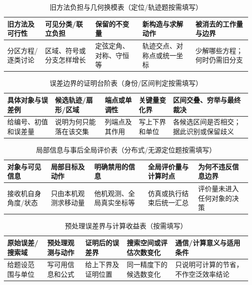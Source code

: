 \documentclass[withoutpreface,bwprint]{cumcmthesis}
\begin{document}
  \begin{table}[H]
    \centering
    \small
    \caption{旧方法负担与几何换模表（定位/轨迹题按需填写）}
    \label{tab:method-burden-switch-guide}
    \begin{tabular}{p{2.1cm}p{2.8cm}p{2.45cm}p{2.75cm}p{2.55cm}}
      \toprule
      旧方法及可行性 & 可见分类/联立负担 & 保留的不变量 & 新构造与求解动作 & 被消去的工作量与边界 \\
      \midrule
      分区方程/逐类讨论 & 区域、符号或分支怎样增长 & 定弦定角、对称、守恒等 & 轨迹交点、对称点或统一坐标 & 少解哪些方程；何时仍需旧分支 \\
      \bottomrule
    \end{tabular}
  \end{table}
  \begin{table}[H]
    \centering
    \small
    \caption{误差边界的证明台阶表（身份/区间判定按需填写）}
    \label{tab:error-bound-proof-guide}
    \begin{tabular}{p{2.15cm}p{2.85cm}p{2.15cm}p{2.25cm}p{3.25cm}}
      \toprule
      具体对象与误差例 & 候选轨迹/扇形/区域 & 端点或单调性 & 关键量变化界 & 区间交叠、穷举与最终裁决 \\
      \midrule
      给编号、初值和误差量 & 说明为何只能落在该交集 & 列端点及其作用 & 写上下界和单位 & 各候选区间是否相交；据此识别或保留歧义 \\
      \bottomrule
    \end{tabular}
  \end{table}
  \begin{table}[H]
    \centering
    \small
    \caption{局部信息与事后全局评价表（分布式/无源定位题按需填写）}
    \label{tab:local-global-information-guide}
    \begin{tabular}{p{2.2cm}p{2.45cm}p{2.25cm}p{2.7cm}p{3.0cm}}
      \toprule
      对象与可见信息 & 局部目标及动作 & 明确禁用的信息 & 全局评价量与计算时点 & 为何不违反信息边界 \\
      \midrule
      接收机自身角度/状态 & 只由本机观测求移动量 & 他机观测、全局真实坐标等 & 仿真或执行结束后统一汇总 & 评价量未进入任何对象的决策 \\
      \bottomrule
    \end{tabular}
  \end{table}
  \begin{table}[H]
    \centering
    \small
    \caption{预处理误差界与计算收益表（按需填写）}
    \label{tab:preprocess-bound-cost-guide}
    \begin{tabular}{p{2.25cm}p{2.45cm}p{2.45cm}p{2.65cm}p{2.85cm}}
      \toprule
      原始误差/搜索域 & 预处理观测与动作 & 证明后的误差界 & 搜索空间或评估次数变化 & 通信/计算意义与适用条件 \\
      \midrule
      给题设范围与单位 & 写可用信息和公式 & 给上下界及证明位置 & 同一精度下的候选数变化 & 只说明可计算的节省，不作空泛效率结论 \\
      \bottomrule
    \end{tabular}
  \end{table}
\end{document}
